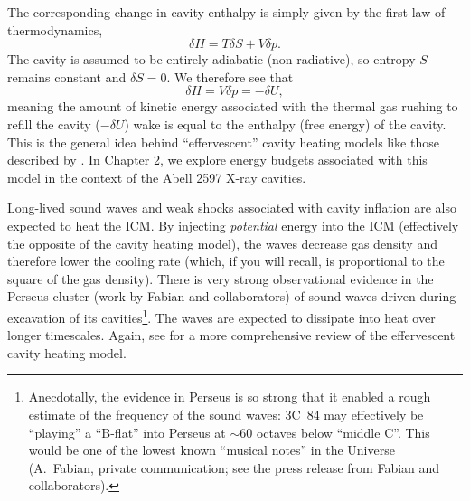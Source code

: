 The corresponding change in cavity enthalpy is simply given by the first law of thermodynamics,   
\begin{equation}
\delta H = T \delta S + V \delta p. 
\end{equation}
The cavity is assumed to be entirely adiabatic (non-radiative), so entropy $S$ remains constant and $\delta S=0$. 
We therefore see that
\begin{equation}
\delta H = V \delta p = - \delta U, 
\end{equation} 
meaning the amount of kinetic energy associated with the thermal gas rushing to refill the cavity  ($-\delta U$) 
wake is equal to the enthalpy (free energy) of the cavity. This is the general idea behind ``effervescent'' cavity 
heating models like those described by \citet{begelman01,ruszkowski02}. 
In Chapter 2, we explore energy budgets associated with this model in the context of the Abell 2597 X-ray cavities.  


Long-lived sound waves and weak shocks associated with cavity inflation 
are also expected to heat the ICM. 
By  injecting {\it potential} energy into the ICM (effectively the opposite of the cavity heating model), 
the waves decrease gas density and  therefore 
lower the cooling rate (which, if you will recall, is proportional to the square of the gas density). 
There is very strong observational evidence in the Perseus cluster (work by Fabian and collaborators) 
of sound waves driven during excavation of its cavities\footnote{Anecdotally, the evidence in Perseus is so 
strong that it enabled a rough estimate of the frequency of the sound waves: 3C~84 may effectively be ``playing'' a ``B-flat'' into Perseus at $\sim 60$ octaves below ``middle C''. This would  
be one of the lowest known ``musical notes'' in the Universe (A.~Fabian, private communication; see the press release from Fabian and collaborators). }. The waves are expected to dissipate into heat 
over longer timescales. Again, see \citet{mcnamara07} for a more comprehensive review of the effervescent cavity heating model. 





